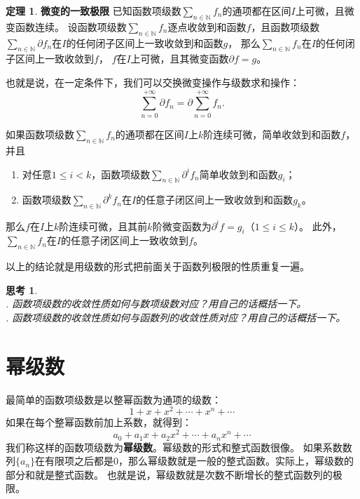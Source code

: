 \documentclass[12pt,UTF8]{ctexbook}
\theoremstyle{definition}
\newtheorem{tm}{定理}[section]
\theoremstyle{plain}
\newtheorem{sk}{思考}[section]
\begin{document}
\begin{tm}{\textbf{微变的一致极限}}
    已知函数项级数$\sum_{n\in\mathbb{N}} f_n$的通项都在区间$I$上可微，且微变函数连续。
    设函数项级数$\sum_{n\in\mathbb{N}} f_n$逐点收敛到和函数$f$，且函数项级数$\sum_{n\in\mathbb{N}} \partial f_n$在$I$的任何闭子区间上一致收敛到和函数$g$，
    那么$\sum_{n\in\mathbb{N}} f_n$在$I$的任何闭子区间上一致收敛到$f$，
    $f$在$I$上可微，且其微变函数$\partial f = g$。

    也就是说，在一定条件下，我们可以交换微变操作与级数求和操作：
    $$ \sum_{n=0}^{+\infty} \partial f_n = \partial \sum_{n=0}^{+\infty} f_n. $$
    
    如果函数项级数$\sum_{n\in\mathbb{N}} f_n$的通项都在区间$I$上$k$阶连续可微，简单收敛到和函数$f$，并且
    \begin{enumerate}
        \item 对任意$1 \leqslant i < k$，函数项级数$\sum_{n\in\mathbb{N}} \partial^i f_n$简单收敛到和函数$g_i$；
        \item 函数项级数$\sum_{n\in\mathbb{N}} \partial^k f_n$在$I$的任意子闭区间上一致收敛到和函数$g_k$。
    \end{enumerate}
    那么$f$在$I$上$k$阶连续可微，且其前$k$阶微变函数为$\partial^i f = g_i$（$1 \leqslant i\leqslant k$）。
    此外，$\sum_{n\in\mathbb{N}} f_n$在$I$的任意子闭区间上一致收敛到$f$。
\end{tm}

以上的结论就是用级数的形式把前面关于函数列极限的性质重复一遍。

\begin{sk}
    \mbox{} \\
    . 函数项级数的收敛性质如何与数项级数对应？用自己的话概括一下。\\
    . 函数项级数的收敛性质如何与函数列的收敛性质对应？用自己的话概括一下。
\end{sk}

\chapter{幂级数}

最简单的函数项级数是以整幂函数为通项的级数：
$$ 1 + x + x^2 + \cdots + x^n + \cdots$$
如果在每个整幂函数前加上系数，就得到：
$$ a_0 + a_1x + a_2x^2 + \cdots + a_n x^n + \cdots$$
我们称这样的函数项级数为\textbf{幂级数}。幂级数的形式和整式函数很像。
如果系数数列$\{a_n\}$在有限项之后都是$0$，那么幂级数就是一般的整式函数。实际上，幂级数的部分和就是整式函数。
也就是说，幂级数就是次数不断增长的整式函数列的极限。
\end{document}
